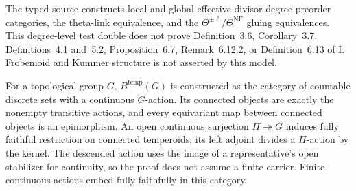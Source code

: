\begin{definition}
  \label{def:iut-i-theater-realization}
  \leanok
  The typed source constructs local and global effective-divisor
  degree preorder categories, the theta-link equivalence, and the
  \(\Theta^{\pm\ell}/\Theta^{\mathrm{NF}}\) gluing equivalences.  This
  degree-level test double does not prove Definition~3.6, Corollary~3.7,
  Definitions~4.1 and~5.2, Proposition~6.7, Remark~6.12.2, or
  Definition~6.13 of \IUT{} I.  Frobenioid and Kummer structure is not
  asserted by this model.
\end{definition}

\begin{definition}
  \label{def:countable-temperoids}
  \leanok
  For a topological group $G$, $B^{\mathrm{temp}}(G)$ is constructed as
  the category of countable discrete sets with a continuous $G$-action.
  Its connected objects are exactly the nonempty transitive actions, and every
  equivariant map between connected objects is an epimorphism.  An open continuous
  surjection \(\Pi\twoheadrightarrow G\) induces fully faithful restriction on
  connected temperoids; its left adjoint divides a \(\Pi\)-action by the
  kernel.  The descended action uses the image of a representative's open
  stabilizer for continuity, so the proof does not assume a finite carrier.
  Finite continuous actions embed fully faithfully in this category.
\end{definition}

